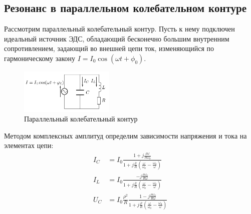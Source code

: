\subsection*{Резонанс в параллельном колебательном контуре}

Рассмотрим параллельный колебательный контур. Пусть к нему подключен идеальный источник ЭДС, обладающий бесконечно большим внутренним сопротивлением, задающий во внешней цепи ток, изменяющийся по гармоническому закону $I = I_0 \cos{\left(\omega t + \phi_0\right)}$.

\begin{figure}[H]
	\vspace{-10pt}
	\centering
	\includegraphics[width=0.4\textwidth]{../res/parallel_contour.png}
	\caption{Параллельный колебательный контур}
	\label{fig:parallel_contour}
\end{figure}

Методом комплексных амплитуд определим зависимости напряжения и тока на элементах цепи:
\begin{equation*}
	\begin{split}
		I_C &= I_0 \frac{1 + j \frac{\rho \omega}{R \omega_0}}{1 + j \frac{\rho}{R} \left( \frac{\omega}{\omega_0} - \frac{\omega_0}{\omega} \right) } \\
		I_L &= I_0 \frac{-j \frac{\rho \omega_0}{R \omega}}{1 + j \frac{\rho}{R}\left(\frac{\omega}{\omega_0} - \frac{\omega_0}{\omega}\right)} \\
		U_C &= I_0 \frac{\rho^2}{R} \frac{1-j \frac{\rho \omega_0}{R \omega}}{1 + j \frac{\rho}{R}\left(\frac{\omega}{\omega_0} - \frac{\omega_0}{\omega}\right)}
	\end{split}
\end{equation*}

